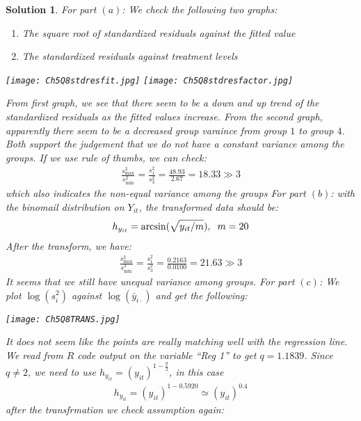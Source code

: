 \documentclass[11pt]{article}
\newtheorem{sol}{Solution}
\begin{document}
\begin{sol}
	For part $(a)$:\vskip 2mm
	We check the following two graphs:
	\begin{enumerate}
		\item [(1)] The square root of standardized residuals against the fitted value
		\item [(2)] The standardized residuals against treatment levels
	\end{enumerate}
	\begin{center}
		\texttt{[image: Ch5Q8stdresfit.jpg]}
		\texttt{[image: Ch5Q8stdresfactor.jpg]}
	\end{center}
	From first graph, we see that there seem to be a down and up trend of the standardized residuals as the fitted values increase. From the second graph, apparently there seem to be a decreased group varaince from group $1$ to group $4$.\vskip 2mm
	Both support the judgement that we do not have a constant variance among the groups.\vskip 2mm
	If we use rule of thumbs, we can check:
	\begin{align*}
		\frac{s^2_{\max}}{s^2_{\min}} = \frac{s^2_1}{s^2_3} = \frac{48.93}{2.67} = 18.33 \gg 3
	\end{align*}
	which also indicates the non-equal variance among the groups\vskip 2mm
	\vskip 2mm
	For part $(b)$:\vskip 2mm
	with the binomail distribution on $Y_{it}$, the transformed data should be:
	\begin{align*}
		h_{y_{it}} = \arcsin(\sqrt{y_{it}/m}), \hskip 2mm m = 20
	\end{align*}
	After the transform, we have:
	\begin{align*}
		\frac{s^2_{\max}}{s^2_{\min}} = \frac{s^2_1}{s^2_3} = \frac{0.2163}{0.0100}=  21.63 \gg 3 
	\end{align*}
	It seems that we still have unequal variance among groups.\vskip 2mm
	For part $(c)$:\vskip 2mm
	We plot $\log(s^2_i)$ against $\log(\bar{y}_{i\cdot})$ and get the following:
	\begin{center}
		\texttt{[image: Ch5Q8TRANS.jpg]}
	\end{center}
	It does not seem like the points are really matching well with the regression line. We read from $R$ code output on the variable ``Reg 1'' to get $q = 1.1839$. Since $q\neq 2$, we need to use $h_{y_{it}} = (y_{it})^{1 - \frac{q}{2}}$, in this case 
	\begin{align*}
		h_{y_{it}} = (y_{it})^{1 - 0.5920} \simeq (y_{it})^{0.4}
	\end{align*} 
	after the transfrmation we check assumption again:

\end{sol}
\end{document}
